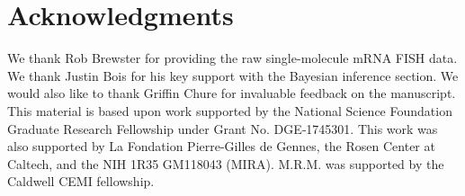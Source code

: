 \section*{Acknowledgments}

We thank Rob Brewster for providing the raw single-molecule mRNA FISH data. We
thank Justin Bois for his key support with the Bayesian inference section. We
would also like to thank Griffin Chure for invaluable feedback on the
manuscript. This material is based upon work supported by the National Science
Foundation Graduate Research Fellowship under Grant No. DGE‐1745301. This work
was also supported by La Fondation Pierre-Gilles de Gennes, the Rosen Center at
Caltech, and the NIH 1R35 GM118043 (MIRA). M.R.M. was supported by the Caldwell
CEMI fellowship. 